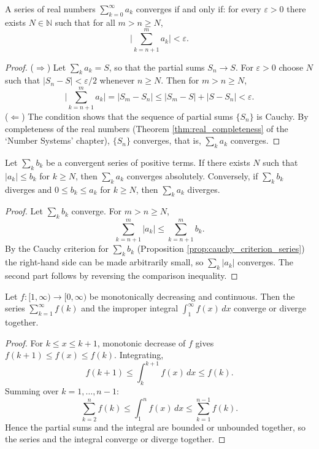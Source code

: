 \begin{proposition}\label{prop:cauchy_criterion_series}
A series of real numbers $\sum_{k=0}^{\infty} a_k$ converges if and only if: for every $\varepsilon > 0$ there exists $N \in \mathbb{N}$ such that for all $m > n \ge N$,
\[
\Big| \sum_{k=n+1}^{m} a_k \Big| < \varepsilon.
\]
\end{proposition}

\begin{proof}
($\Rightarrow$) Let $\sum_k a_k = S$, so that the partial sums $S_n \to S$. For $\varepsilon > 0$ choose $N$ such that $|S_n - S| < \varepsilon/2$ whenever $n \ge N$. Then for $m > n \ge N$,
\[
\Big| \sum_{k=n+1}^{m} a_k \Big| = |S_m - S_n| \le |S_m - S| + |S - S_n| < \varepsilon.
\]
($\Leftarrow$) The condition shows that the sequence of partial sums $\{S_n\}$ is Cauchy. By completeness of the real numbers (Theorem \ref{thm:real_completeness} of the `Number Systems' chapter), $\{S_n\}$ converges, that is, $\sum_k a_k$ converges.
\end{proof}

\begin{proposition}\label{prop:comparison_test}
Let $\sum_k b_k$ be a convergent series of positive terms. If there exists $N$ such that $|a_k| \le b_k$ for $k \ge N$, then $\sum_k a_k$ converges absolutely. Conversely, if $\sum_k b_k$ diverges and $0 \le b_k \le a_k$ for $k \ge N$, then $\sum_k a_k$ diverges.
\end{proposition}

\begin{proof}
Let $\sum_k b_k$ converge. For $m > n \ge N$,
\[
\sum_{k=n+1}^{m} |a_k| \le \sum_{k=n+1}^{m} b_k.
\]
By the Cauchy criterion for $\sum_k b_k$ (Proposition \ref{prop:cauchy_criterion_series}) the right-hand side can be made arbitrarily small, so $\sum_k |a_k|$ converges. The second part follows by reversing the comparison inequality.
\end{proof}

\begin{proposition}\label{prop:integral_test}
Let $f: [1, \infty) \to [0, \infty)$ be monotonically decreasing and continuous. Then the series $\sum_{k=1}^{\infty} f(k)$ and the improper integral $\int_1^{\infty} f(x)\,dx$ converge or diverge together.
\end{proposition}

\begin{proof}
For $k \le x \le k+1$, monotonic decrease of $f$ gives $f(k+1) \le f(x) \le f(k)$. Integrating,
\[
f(k+1) \le \int_k^{k+1} f(x)\,dx \le f(k).
\]
Summing over $k = 1, \dots, n-1$:
\[
\sum_{k=2}^{n} f(k) \le \int_1^n f(x)\,dx \le \sum_{k=1}^{n-1} f(k).
\]
Hence the partial sums and the integral are bounded or unbounded together, so the series and the integral converge or diverge together.
\end{proof}

